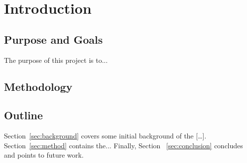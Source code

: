 \section{Introduction}
\label{sec:intro}



\subsection{Purpose and Goals}

The purpose of this project is to...
\vspace{2cm}



\subsection{Methodology}


\vspace{2cm}

\subsection{Outline}

Section~\ref{sec:background} covers some initial background of the [\dots]. Section~\ref{sec:method} contains the... Finally, Section ~\ref{sec:conclusion} concludes and points to future work.





